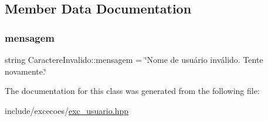 \subsection{Member Data Documentation}
\mbox{\label{classCaractereInvalido_ad7722f62c4ddc09838c94ef06d540780}} 
\subsubsection{\texorpdfstring{mensagem}{mensagem}}
{\footnotesize\ttfamily string Caractere\+Invalido\+::mensagem = \char`\"{}Nome de usuário inválido. Tente novamente.\char`\"{}\hspace{0.3cm}{\ttfamily [private]}}



The documentation for this class was generated from the following file\+:\begin{DoxyCompactItemize}
\item 
include/excecoes/\hyperlink{exc__usuario_8hpp}{exc\+\_\+usuario.\+hpp}\end{DoxyCompactItemize}
